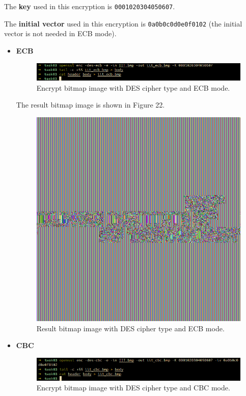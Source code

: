 \documentclass{article}
\begin{document}
The \textbf{key} used in this encryption is \texttt{0001020304050607}.

The \textbf{initial vector} used in this encryption is \texttt{0a0b0c0d0e0f0102}
(the initial vector is not needed in ECB mode).

\begin{itemize}
    \item \textbf{ECB}
        \begin{figure}[!ht]
            \centering
            \includegraphics[scale=0.68]{task03_1_des.png}
            \caption{Encrypt bitmap image with DES cipher type and ECB mode.}
        \end{figure}

        The result bitmap image is shown in Figure 22.

        \begin{figure}[!ht]
            \centering
            \includegraphics[scale=0.68]{iit_ecb.png}
            \caption{Result bitmap image with DES cipher type and ECB mode.}
        \end{figure}

    \item \textbf{CBC}
        \begin{figure}[!ht]
            \centering
            \includegraphics[scale=0.68]{task03_1_des_2.png}
            \caption{Encrypt bitmap image with DES cipher type and CBC mode.}
        \end{figure}


\end{itemize}
\end{document}
